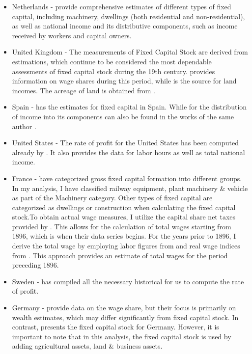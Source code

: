 \documentclass[10pt]{article}
\begin{document}
\begin{itemize}
    \item Netherlands - \citet{SmitsHorlingsZanden2000} provide comprehensive estimates of different types of fixed capital, including machinery, dwellings (both residential and non-residential), as well as national income and its distributive components, such as income received by workers and capital owners.
    \item United Kingdom - The measurements of Fixed Capital Stock are derived from \citet{feinstein1998pessimism} estimations, which continue to be considered the most dependable assessments of fixed capital stock during the 19th century. \citet{Clark2010} provides information on wage shares during this period, while \citet{Clark2002} is the source for land incomes. The acreage of land is obtained from \citet{Allen2005}.
    \item Spain - \citet{PradosEscosura2022} has the estimates for fixed capital in Spain. While for the distribution of income into its components can also be found in the works of the same author \citep{PradosEscosura2017}.
    \item United States - The rate of profit for the United States has been computed already by \citet{dumenil2013uslt}. It also provides the data for labor hours as well as total national income. 
    \item France - \citet{levy2008french} have categorized gross fixed capital formation into different groups. In my analysis, I have classified railway equipment, plant machinery \& vehicle as part of the Machinery category. Other types of fixed capital are categorized as dwellings or construction when calculating the fixed capital stock.To obtain actual wage measures, I utilize the capital share net taxes provided by \citet{PikettyZucman2014}. This allows for the calculation of total wages starting from 1896, which is when their data series begins. For the years prior to 1896, I derive the total wage by employing labor figures from \citet{Mitchell1975} and real wage indices from \citet{levy2008french}. This approach provides an estimate of total wages for the period preceding 1896.
    \item Sweden - \citet{Edvinsson2016} has compiled all the necessary historical for us to compute the rate of profit. 
    \item Germany - \citet{PikettyZucman2014} provide data on the wage share, but their focus is primarily on wealth estimates, which may differ significantly from fixed capital stock. In contrast, \citet{Hoffmann1965} presents the fixed capital stock for Germany. However, it is important to note that in this analysis, the fixed capital stock is used by adding agricultural assets, land \& business assets. 

\end{itemize} 
 
 
\newpage
\end{document}
